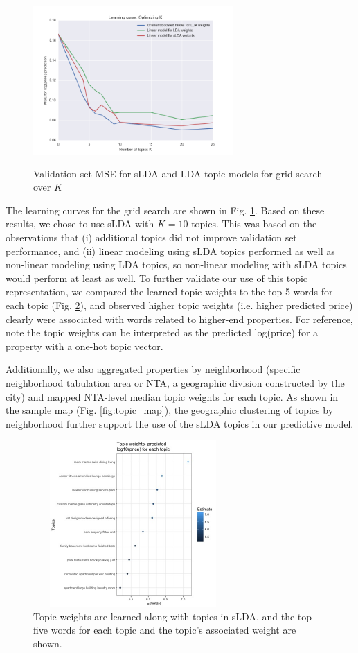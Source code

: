 \documentclass[journal]{IEEEtran}
\begin{document}
\begin{figure}
    \centering
    \includegraphics[width=3in,height=2.5in,clip,keepaspectratio]{learning_curve.png}
    \caption{Validation set MSE for sLDA and LDA topic models for grid search over $K$}
    \label{fig:LDA_grid_search}
\end{figure}

The learning curves for the grid search are shown in Fig. \ref{fig:LDA_grid_search}. 
Based on these results, we chose to use sLDA with $K = 10$ topics. This was based on the observations that (i) additional topics did not improve validation set performance, and (ii) linear modeling using sLDA topics performed as well as non-linear modeling using LDA topics, so non-linear modeling with sLDA topics would perform at least as well. To further validate our use of this topic representation, we compared the learned topic weights to the top 5 words for each topic (Fig. \ref{fig:topic_weights}), and observed higher topic weights (i.e. higher predicted price) clearly were associated with words related to higher-end properties. For reference, note the topic weights can be interpreted as the predicted log(price) for a property with a one-hot topic vector.

Additionally, we also aggregated properties by neighborhood (specific neighborhood tabulation area or NTA, a geographic division constructed by the city) and mapped NTA-level median topic weights for each topic. As shown in the sample map (Fig. \ref{fig:topic_map}), the geographic clustering of topics by neighborhood further support the use of the sLDA topics in our predictive model.

\begin{figure}
    \centering
    \includegraphics[width=3in,height=2.5in,clip,keepaspectratio]{topic_weights.jpeg}
    \caption{Topic weights are learned along with topics in sLDA, and the top five words for each topic and the topic's associated weight are shown.}
    \label{fig:topic_weights}
\end{figure}
\end{document}
